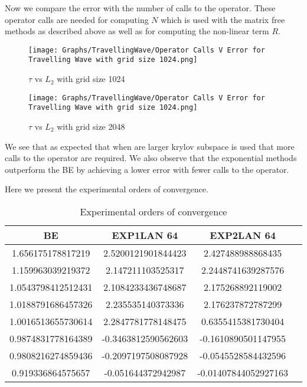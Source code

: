 Now we compare the error with the number of calls to the operator.
These operator calls are needed for computing $N$ which is used with the matrix free methods as described above as well as for computing the non-linear term $R$.

\begin{figure}[H]
    \centering
    \begin{minipage}{0.49\textwidth}
        \texttt{[image: Graphs/TravellingWave/Operator Calls V Error for Travelling Wave with grid size 1024.png]} %
        \caption{$\tau$ vs $L_2$ with grid size 1024}
        \label{fig:plot1}
    \end{minipage}\hfill
    \centering
    \begin{minipage}{0.49\textwidth}
        \texttt{[image: Graphs/TravellingWave/Operator Calls V Error for Travelling Wave with grid size 1024.png]} %
        \caption{$\tau$ vs $L_2$ with grid size 2048}
        \label{fig:plot2}
    \end{minipage}\hfill
\end{figure}

We see that as expected that when are larger krylov subspace is used that more calls to the operator are required.
We also observe that the exponential methods outperform the BE by achieving a lower error with fewer calls to the operator.

Here we present the experimental orders of convergence.

\begin{table}[H]
    \centering
    \begin{tabular}{| c | c | c | c}
    \hline
    BE & EXP1LAN 64 & EXP2LAN 64 \\
    \hline
    1.656175178817219 & 2.5200121901844423 & 2.427488988868435 \\
    1.159963039219372 & 2.147211103525317 & 2.2448741639287576 \\
    1.0543798412512431 & 2.1084233436748687 & 2.175268892119002 \\
    1.0188791686457326 & 2.235535140373336 & 2.176237872787299 \\
    1.0016513655730614 & 2.2847781778148475 & 0.6355415381730404 \\
    0.9874831778164389 & -0.3463812590562603 & -0.1610890501147955 \\
    0.9808216274859436 & -0.2097197508087928 & -0.0545528584432596 \\
    0.919336864575657 & -0.051644372942987 & -0.01407844052927163 \\
    \hline
    \end{tabular}
    \caption{Experimental orders of convergence}
    \label{tab:EOCs}
\end{table}


